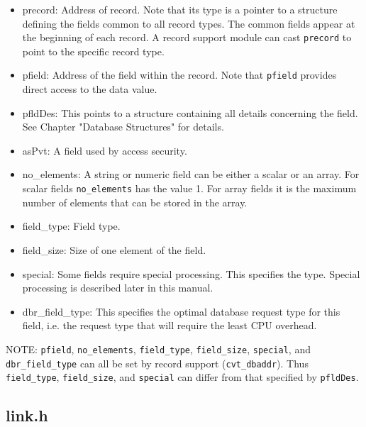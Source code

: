 \begin{itemize}\item {}precord: Address of record. Note that its type is a pointer to a structure defining the fields common to all record 
types. The common fields appear at the beginning of each record. A record support module can cast \verb|precord| to 
point to the specific record type.

\item {}pfield: Address of the field within the record. Note that \verb|pfield| provides direct access to the data value.

\item {}pfldDes: This points to a structure containing all details concerning the field. See Chapter "Database Structures" 
for details.

\item {}asPvt: A field used by access security.

\item {}no\_elements: A string or numeric field can be either a scalar or an array. For scalar fields \verb|no_elements| has the 
value 1. For array fields it is the maximum number of elements that can be stored in the array.

\item {}field\_type: Field type.

\item {}field\_size: Size of one element of the field.

\item {}special: Some fields require special processing. This specifies the type. Special processing is described later in this 
manual.

\item {}dbr\_field\_type: This specifies the optimal database request type for this field, i.e. the request type that will require 
the least CPU overhead.

\end{itemize}NOTE: \verb|pfield|, \verb|no_elements|, \verb|field_type|, \verb|field_size|, \verb|special|, and \verb|dbr_field_type| can all be set by 
record support (\verb|cvt_dbaddr|). Thus \verb|field_type|, \verb|field_size|, and \verb|special| can differ from that specified by 
\verb|pfldDes|.

\subsection{link.h }

